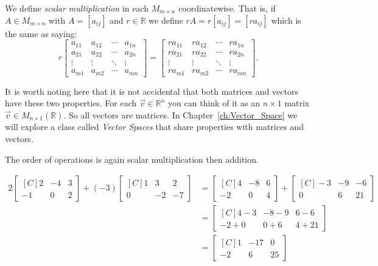 \begin{definition} We define 
\emph{scalar multiplication} in each $M_{m\times n}$ coordinatewise. That is, 
if $A \in M_{m \times n}$ with $A=[a_{ij}]$ and $r \in \mathbb{R}$ we define 
$rA=r[a_{ij}]=[ra_{ij}]$ which is the same as saying:
\[
r\begin{bmatrix}
a_{11} & a_{12} & \cdots & a_{1n} \\
a_{21} & a_{22} & \cdots & a_{2n} \\
\vdots & \vdots & \ddots & \vdots \\
a_{m1} & a_{m2} & \cdots & a_{mn}
\end{bmatrix}
=
\begin{bmatrix}
ra_{11} & ra_{12} & \cdots & ra_{1n} \\
ra_{21} & ra_{22} & \cdots & ra_{2n} \\
\vdots  & \vdots  & \ddots & \vdots \\
ra_{m1} & ra_{m2} & \cdots & ra_{mn}
\end{bmatrix}.
\]
\end{definition}

\begin{remark}
It is worth noting here that it is not accidental that both matrices and 
vectors have these two properties. For each $\vec{v} \in \mathbb{R}^n$ you can
think of it as an $n\times 1$ matrix $\vec{v} \in M_{n\times 1}(\mathbb{R})$. 
So all vectors are matrices. In Chapter~\ref{ch:Vector_Space} we will explore
a class called \emph{Vector Spaces} that share properties with matrices and 
vectors.
\end{remark}

The order of operations is again scalar multiplication then addition.

\begin{example}
\begin{align*}
2\begin{bmatrix*}[C]
2  & -4 & 3 \\
-1 & 0  & 2
\end{bmatrix*}+
(-3)\begin{bmatrix*}[C]
1  & 3 & 2 \\
0 & -2  & -7
\end{bmatrix*}
&=
\begin{bmatrix*}[C]
4  & -8 & 6 \\
-2 & 0  & 4
\end{bmatrix*}+
\begin{bmatrix*}[C]
-3 & -9  & -6 \\
0  & 6 & 21
\end{bmatrix*}\\
&=\begin{bmatrix*}[C]
4-3  & -8-9 & 6-6 \\
-2+0 & 0+6  & 4+21
\end{bmatrix*}\\
&=\begin{bmatrix*}[C]
1  & -17 & 0 \\
-2 & 6  & 25
\end{bmatrix*}
\end{align*}
\end{example}



